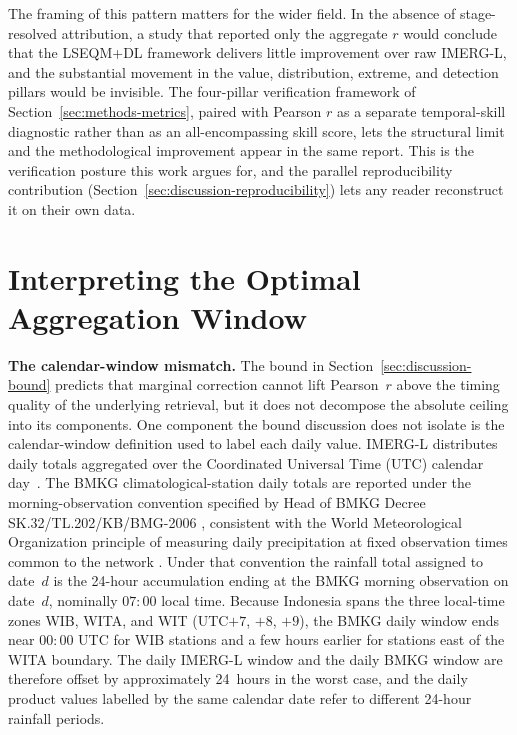 The framing of this pattern matters for the wider field. In the
absence of stage-resolved attribution, a study that reported only
the aggregate $r$ would conclude that the LSEQM+DL framework
delivers little improvement over raw IMERG-L, and the substantial
movement in the value, distribution, extreme, and detection
pillars would be invisible. The four-pillar verification framework
of Section~\ref{sec:methods-metrics}, paired with Pearson $r$ as a
separate temporal-skill diagnostic rather than as an
all-encompassing skill score, lets the structural limit and the
methodological improvement appear in the same report. This is the
verification posture this work argues for, and the parallel
reproducibility contribution
(Section~\ref{sec:discussion-reproducibility}) lets any reader
reconstruct it on their own data.


\section{Interpreting the Optimal Aggregation Window}\label{sec:discussion-subdaily}

\textbf{The calendar-window mismatch.} The bound in
Section~\ref{sec:discussion-bound} predicts that
marginal correction cannot lift Pearson~$r$ above the timing
quality of the underlying retrieval, but it does not decompose
the absolute ceiling into its components. One component the bound
discussion does not isolate is the calendar-window definition used
to label each daily value. IMERG-L distributes daily totals
aggregated over the Coordinated Universal Time (UTC) calendar day~\citep{ref:imergdl07}.
The BMKG climatological-station daily totals are reported
under the morning-observation convention specified by Head of BMKG
Decree SK.32/TL.202/KB/BMG-2006 \citep{ref:bmkg2006sk32},
consistent with the World Meteorological Organization principle of
measuring daily precipitation at fixed observation times common to
the network \citep{ref:wmo2018no8}. Under that convention the
rainfall total assigned to
date~$d$ is the 24-hour accumulation ending at the BMKG morning
observation on date~$d$, nominally $07{:}00$ local time. Because
Indonesia spans the three local-time zones WIB, WITA, and WIT
(UTC$+7$, $+8$, $+9$), the BMKG daily window ends near $00{:}00$
UTC for WIB stations and a few hours earlier for stations east of
the WITA boundary. The daily IMERG-L window and the daily BMKG
window are therefore offset by approximately 24~hours in the
worst case, and the daily product values labelled by the same
calendar date refer to different 24-hour rainfall periods.

